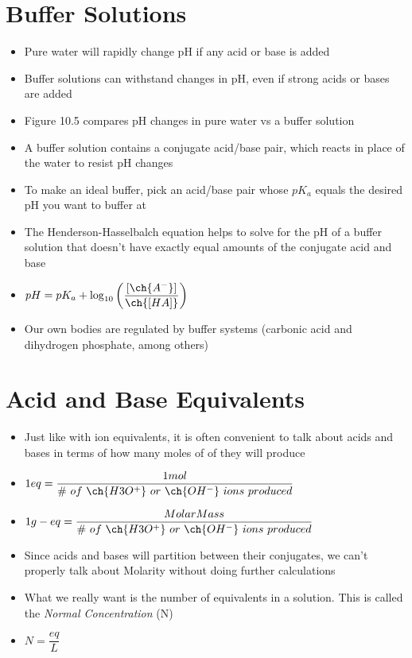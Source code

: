 \documentclass[12pt, openany, letterpaper]{memoir}
\begin{document}
\section{Buffer Solutions}
\begin{itemize}
	\item Pure water will rapidly change pH if any acid or base is added
	\item Buffer solutions can withstand changes in pH, even if strong acids or bases are added
	\item Figure 10.5 compares pH changes in pure water vs a buffer solution
	\item A buffer solution contains a conjugate acid/base pair, which reacts in place of the water to resist pH changes
	\item To make an ideal buffer, pick an acid/base pair whose $pK_a$ equals the desired pH you want to buffer at
	\item The Henderson-Hasselbalch equation helps to solve for the pH of a buffer solution that doesn't have exactly equal amounts of the conjugate acid and base
	\item $pH=pK_a + \log_{10}\left(\dfrac{[\ch{A^-}]}{\ch{[HA]}}\right)$
	\item Our own bodies are regulated by buffer systems (carbonic acid and dihydrogen phosphate, among others)
\end{itemize}

\section{Acid and Base Equivalents}
\begin{itemize}
	\item Just like with ion equivalents, it is often convenient to talk about acids and bases in terms of how many moles of  of  they will produce
	\item $1eq = \dfrac{1mol}{\#~of~\ch{H3O^+}~or~\ch{OH^-}~ions~produced}$
	\item $1g-eq = \dfrac{Molar Mass}{\#~of~\ch{H3O^+}~or~\ch{OH^-}~ions~produced}$
	\item Since acids and bases will partition between their conjugates, we can't properly talk about Molarity without doing further calculations
	\item What we really want is the number of equivalents in a solution. This is called the \emph{Normal Concentration} (N)
	\item $N=\dfrac{eq}{L}$
\end{itemize}
\end{document}
